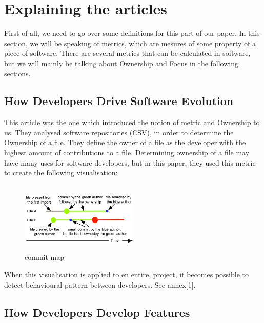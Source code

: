 \section{Explaining the articles}

First of all, we need to go over some definitions for this part of our paper. In this section, we will be speaking of metrics, which are mesures of some property of a piece of software. There are several metrics that can be calculated in software, but we will mainly be talking about Ownership and Focus in the following sections.

\subsection{How Developers Drive Software Evolution}

This article was the one which introduced the notion of metric and Ownership to us. They analysed software repositories (CSV), in order to determine the Ownership of a file. They define the owner of a file as the developer with the highest amount of contributions to a file.
Determining ownership of a file may have many uses for software developers, but in this paper, they used this metric to create the following visualisation:\\
\\
\begin{figure}[p]
\includegraphics[width=0.5\textwidth]{./resources/girba2005.png}~
\caption{commit map}
\label{fig:commit_map}
\end{figure}

When this visualisation is applied to en entire, project, it becomes possible to detect behavioural pattern between developers. See annex[1].

\subsection{How Developers Develop Features}

